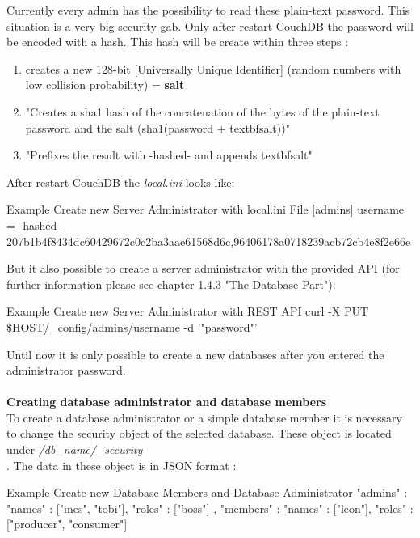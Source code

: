 Currently every admin has the possibility to read these plain-text password. This situation is a very big security gab. Only after restart CouchDB the password will be encoded with a hash. This hash will be create within three steps \cite{Anderson.2010.Buch}:
\begin{enumerate}
\item creates a new 128-bit [Universally Unique Identifier] (random numbers with low collision probability) = \textbf{salt} \cite{Anderson.2010.Buch}
\item "Creates a sha1 hash of the concatenation of the bytes of the plain-text password and the salt (sha1(password + textbf{salt}))" \\ \cite{Anderson.2010.Buch}
\item "Prefixes the result with -hashed- and appends textbf{salt}" \\ \cite{Anderson.2010.Buch}
\end{enumerate}
After restart CouchDB the \textit{local.ini} looks like:
\begin{mylisting}{Example Create new Server Administrator with local.ini File \cite{ApacheSoftwareFoundation.2013.AdminAccount}}
[admins]
username = -hashed-207b1b4f8434dc60429672c0c2ba3aae61568d6c,96406178a0718239acb72cb4e8f2e66e
\end{mylisting}
But it also possible to create a server administrator with the provided API (for further information please see chapter 1.4.3 "The Database Part"): \\ \cite{Anderson.2010.Buch}
\begin{mylisting}{Example Create new Server Administrator with REST API \cite{Anderson.2010.Buch}}
curl -X PUT \$HOST/\_config/admins/username -d '"password"'
\end{mylisting} 

Until now it is only possible to create a new databases after you entered the administrator password. \\
\\
\textbf{Creating database administrator and database members}
\\
To create a database administrator or a simple database member it is necessary to change the security object of the selected database. These object is located under \textit{\slash db\_name\slash\_security} \\ \cite{ApacheSoftwareFoundation.2013.SecurityFeatures}.
The data in these object is in JSON format \cite{ApacheSoftwareFoundation.2013.SecurityFeatures}:
\begin{mylisting}{Example Create new Database Members and Database Administrator \cite{ApacheSoftwareFoundation.2013.SecurityFeatures}}
{
  "admins" : {
     "names" : ["ines", "tobi"],
     "roles" : ["boss"]
   },
   "members" : {
     "names" : ["leon"],
     "roles" : ["producer", "consumer"]
   }
}
\end{mylisting}

